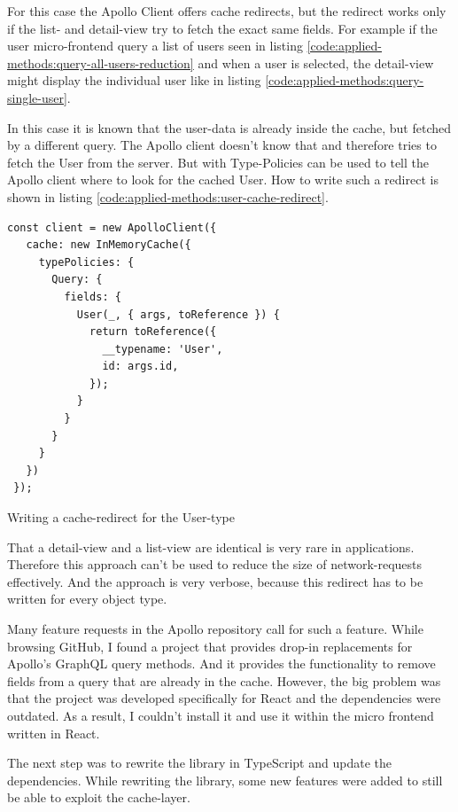 For this case the Apollo Client offers cache redirects, but the redirect works only if the list- and detail-view try to fetch the exact same fields. For example if the user micro-frontend query a list of users seen in listing \ref{code:applied-methods:query-all-users-reduction} and when a user is selected, the detail-view might display the individual user like in listing \ref{code:applied-methods:query-single-user}.

In this case it is known that the user-data is already inside the cache, but fetched by a different query. The Apollo client doesn't know that and therefore tries to fetch the User from the server. But with Type-Policies can be used to tell the Apollo client where to look for the cached User. How to write such a redirect is shown in listing \ref{code:applied-methods:user-cache-redirect}.

\ifshowListings
\begin{listing}[H]
\begin{verbatim}
const client = new ApolloClient({
   cache: new InMemoryCache({
     typePolicies: {
       Query: {
         fields: {
           User(_, { args, toReference }) {
             return toReference({
               __typename: 'User',
               id: args.id,
             });
           }
         }
       }
     }
   })
 });
\end{verbatim}
\caption{Writing a cache-redirect for the User-type}\label{code:applied-methods:user-cache-redirect}
\end{listing}
\fi

That a detail-view and a list-view are identical is very rare in applications. Therefore this approach can't be used to reduce the size of network-requests effectively. And the approach is very verbose, because this redirect has to be written for every object type.

Many feature requests in the Apollo repository call for such a feature. While browsing GitHub, I found a project that provides drop-in replacements for Apollo's GraphQL query methods. And it provides the functionality to remove fields from a query that are already in the cache. However, the big problem was that the project was developed specifically for React and the dependencies were outdated. As a result, I couldn't install it and use it within the micro frontend written in React.

The next step was to rewrite the library in TypeScript and update the dependencies. While rewriting the library, some new features were added to still be able to exploit the cache-layer.

